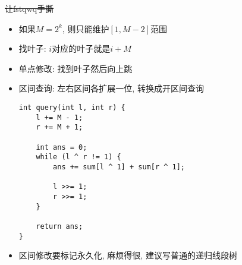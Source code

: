 \sout{让fstqwq手撕}

\begin{itemize}
	\item 如果$M = 2^k$, 则只能维护$[1, M - 2]$范围
	\item 找叶子: $i$对应的叶子就是$i + M$
	\item 单点修改: 找到叶子然后向上跳
	\item 区间查询: 左右区间各扩展一位, 转换成开区间查询
\begin{verbatim}
int query(int l, int r) {
    l += M - 1;
    r += M + 1;

    int ans = 0;
    while (l ^ r != 1) {
        ans += sum[l ^ 1] + sum[r ^ 1];

        l >>= 1;
        r >>= 1;
    }

    return ans;
}
\end{verbatim}
	
	\item 区间修改要标记永久化, 麻烦得很, 建议写普通的递归线段树
\end{itemize}